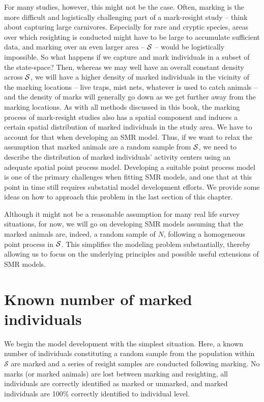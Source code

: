 For many studies, however, this might not be the
case. Often, marking is the more difficult and logistically
challenging part of a mark-resight study -- think about capturing
large carnivores. Especially for rare and cryptic species, areas over
which resighting is conducted might have to be large to accumulate
sufficient data, and marking over an even larger area -- ${\cal S}$ --
would be logistically impossible.
So what happens if we capture and mark individuals in a subset of the
state-space? Then, whereas we may well have an overall constant density
across ${\cal S}$, we will have a higher density of marked individuals in the vicinity of the marking locations -- live
traps, mist nets, whatever is used to catch animals -- and the density of marks will generally go down as we get further away from the marking
locations. As with all methods discussed in this book, the marking process of mark-resight studies also has a spatial component and induces a certain spatial distribution of marked individuals in the study area. We have to account for that when developing an SMR model.
Thus, if we want to relax the assumption that marked animals are a random sample from ${\cal S}$, we need to describe the distribution of marked individuals' activity centers using an adequate spatial
point process model. Developing a suitable point process model is one of the primary
challenges when fitting SMR models, and one that at this point in time still requires substatial model development efforts. We provide some ideas on how to approach this problem in the last section of
this chapter. 

Although it might not be a reasonable assumption for many real life survey situations, for now, we will go on developing SMR models assuming
that the marked animals are, indeed, a random sample of $N$, following a homogeneous point process in ${\cal S}$. This simplifies the modeling problem substantially, thereby allowing us to focus on the underlying principles and possible useful extensions of SMR models.  




\section{Known number of marked individuals}

We begin the model development with the simplest situation. Here, a
known number of individuals constituting a random
sample from the population within $\mathcal{S}$ are marked and a
series of resight samples are conducted following marking. No marks
(or marked animals) are lost between marking and resighting, all
individuals are correctly identified as marked or unmarked, and marked
individuals are 100\% correctly identified to individual level.

